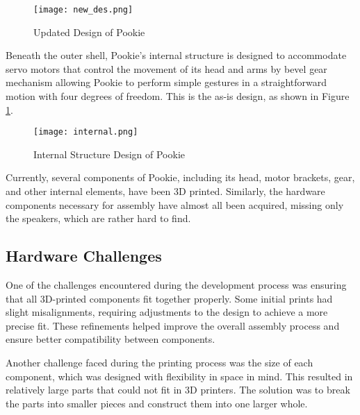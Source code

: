 \begin{figure}[ht]
    \centering
    \texttt{[image: new\_des.png]}
    \caption{Updated Design of Pookie}
    \label{fig:new_des}
\end{figure}

\newpage
Beneath the outer shell, Pookie's internal structure is designed to accommodate servo motors that control the movement of its head and arms by bevel gear mechanism allowing Pookie to perform simple gestures in a straightforward motion with four degrees of freedom. This is the as-is design, as shown in Figure \ref{fig:new_des}.

\begin{figure}[!ht]
    \centering
    \texttt{[image: internal.png]}
    \caption{Internal Structure Design of Pookie}
    \label{fig:internal}
\end{figure}

Currently, several components of Pookie, including its head, motor brackets, gear, and other internal elements, have been 3D printed. Similarly, the hardware components necessary for assembly have almost all been acquired, missing only the speakers, which are rather hard to find. 

\subsection{Hardware Challenges}
One of the challenges encountered during the development process was ensuring that all 3D-printed components fit together properly. Some initial prints had slight misalignments, requiring adjustments to the design to achieve a more precise fit. These refinements helped improve the overall assembly process and ensure better compatibility between components.

Another challenge faced during the printing process was the size of each component, which was designed with flexibility in space in mind. This resulted in relatively large parts that could not fit in 3D printers. The solution was to break the parts into smaller pieces and construct them into one larger whole.
